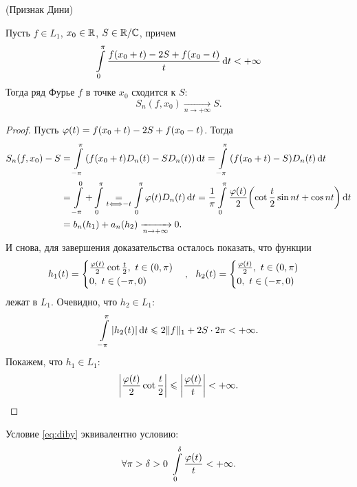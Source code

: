 \begin{theorem}(Признак Дини)

    Пусть $f \in L_1$, $x_0 \in \R$, $S \in \R/\mathbb{C}$, причем
    \begin{equation}
        \intl_0^\pi{\frac{f(x_0 + t) - 2S + f(x_0 - t)}{t} \dd t} < +\infty 
        \label{eq:diby}
    \end{equation}
    Тогда ряд Фурье $f$ в точке $x_0$ сходится к $S$:
    \[
        S_n(f, x_0) \xrightarrow[n \to +\infty]{} S
    .\]
\end{theorem}
\begin{proof}
    Пусть $\f(t) = f(x_0 + t) - 2S + f(x_0 - t)$. Тогда
    \begin{align*}
        S_n(f, x_0) - S 
        &= \intl_{-\pi}^\pi{\parens*{f(x_0 + t) D_n(t) - S D_n(t)} \dd t} = 
        \intl_{-\pi}^\pi{(f(x_0 + t) - S) D_n(t) \dd t} \\
        &= \intl_{-\pi}^0 + \intl_{0}^\pi \underset{t \Llra -t}{=} 
        \intl_{0}^\pi{\f(t) D_n(t) \dd t} = \frac{1}{\pi} \intl_0^\pi{
        \frac{\f(t)}{2} \parens*{\cot{\frac{t}{2}} \sin{nt} + \cos{nt}} \dd t} \\
        &= b_n(h_1) + a_n(h_2) \xrightarrow[n \to +\infty]{} 0
    .\end{align*}
    И снова, для завершения доказательства осталось показать, что функции
    \[
        h_1(t) = \begin{cases}
            \frac{\f(t)}{2} \cot{\frac{t}{2}},~ t \in (0, \pi) \\
            0,~ t \in (-\pi, 0)
        \end{cases},~~
        h_2(t) = \begin{cases}
            \frac{\f(t)}{2},~ t \in (0, \pi) \\
            0,~ t \in (-\pi, 0)
        \end{cases}
    \]
    лежат в $L_1$. Очевидно, что $h_2 \in L_1$:
    \[
        \intl_{-\pi}^\pi{|h_2(t)| \dd t} \leqslant 2 \norm{f}_1 + 2S \cdot 2 \pi
        < +\infty
    .\]
    Покажем, что $h_1 \in L_1$:
    \[
        \abs*{\frac{\f(t)}{2} \cot{\frac{t}{2}}} \leqslant \abs*{\frac{\f(t)}{t}}
        < +\infty
    .\]
\end{proof}

\begin{remark}
    Условие \ref{eq:diby} эквивалентно условию:
    \[
        \forall \pi > \delta > 0~ \intl_0^\delta{\frac{\f(t)}{t}} < +\infty
    .\]
\end{remark}

